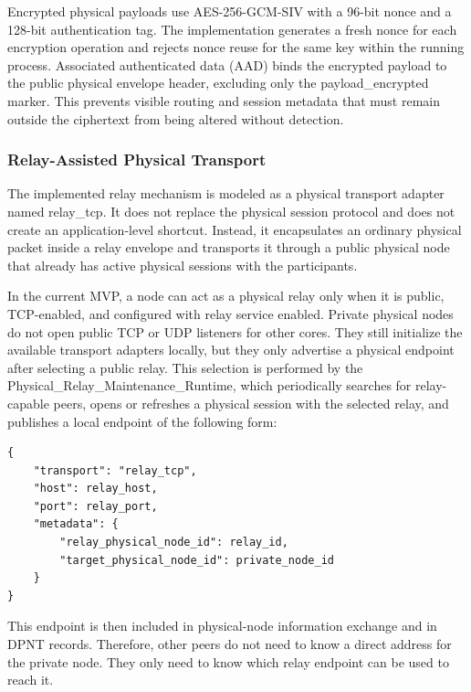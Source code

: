 \documentclass[12pt,a4paper]{article}
\newcommand{\codebreak}[1]{{\footnotesize\ttfamily #1}}
\begin{document}
Encrypted physical payloads use AES-256-GCM-SIV with a 96-bit nonce and a 128-bit authentication tag. The implementation generates a fresh nonce for each encryption operation and rejects nonce reuse for the same key within the running process. Associated authenticated data (AAD) binds the encrypted payload to the public physical envelope header, excluding only the \codebreak{payload\_\allowbreak{}encrypted} marker. This prevents visible routing and session metadata that must remain outside the ciphertext from being altered without detection.

\subsubsection{Relay-Assisted Physical Transport}
\label{subsec:relay-assisted-physical-transport}

The implemented relay mechanism is modeled as a physical transport adapter named \codebreak{relay\_\allowbreak{}tcp}. It does not replace the physical session protocol and does not create an application-level shortcut. Instead, it encapsulates an ordinary physical packet inside a relay envelope and transports it through a public physical node that already has active physical sessions with the participants.

In the current MVP, a node can act as a physical relay only when it is public, TCP-enabled, and configured with relay service enabled. Private physical nodes do not open public TCP or UDP listeners for other cores. They still initialize the available transport adapters locally, but they only advertise a physical endpoint after selecting a public relay. This selection is performed by the \codebreak{Physical\_\allowbreak{}Relay\_\allowbreak{}Maintenance\_\allowbreak{}Runtime}, which periodically searches for relay-capable peers, opens or refreshes a physical session with the selected relay, and publishes a local endpoint of the following form:

\begin{verbatim}
{
    "transport": "relay_tcp",
    "host": relay_host,
    "port": relay_port,
    "metadata": {
        "relay_physical_node_id": relay_id,
        "target_physical_node_id": private_node_id
    }
}
\end{verbatim}

This endpoint is then included in physical-node information exchange and in DPNT records. Therefore, other peers do not need to know a direct address for the private node. They only need to know which relay endpoint can be used to reach it.
\end{document}
